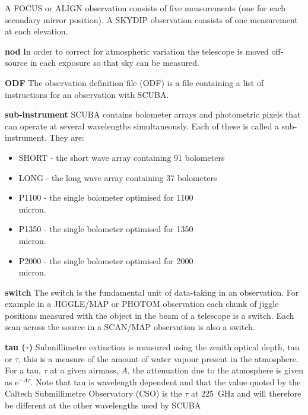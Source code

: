 \documentclass[twoside,11pt]{article}
\newcommand{\htmladdnormallink}[2]{#1}
\renewcommand{\_}{\texttt{\symbol{95}}}
\begin{document}
\begin{description}
A FOCUS or ALIGN observation consists of five measurements (one for each
secondary mirror position). A SKYDIP observation consists of one measurement
at each elevation.

\item{{\bf nod}} In order to correct for atmospheric variation the telescope
is moved off-source in each exposure so that sky can be measured.

\item{{\bf ODF}} The observation definition file (ODF) is a file containing a
list of instructions for an observation with SCUBA.

\item{{\bf sub-instrument}} SCUBA contains bolometer arrays and photometric
pixels that can operate at several wavelengths simultaneously. Each of these
is called a sub-instrument. They are:

\begin{itemize}
\item SHORT - the short wave array containing 91 bolometers
\item LONG - the long wave array containing 37 bolometers
\item P1100 - the single bolometer optimised for 1100\\micron.
\item P1350 - the single bolometer optimised for 1350\\micron.
\item P2000 - the single bolometer optimised for 2000\\micron.
\end{itemize}


\item{{\bf switch}} The switch is the fundamental unit of data-taking in an
observation. For example in a JIGGLE/MAP or PHOTOM observation each chunk of
jiggle positions measured with the object in the beam of a telescope is a
switch. Each scan across the source in a SCAN/MAP observation is also a switch.

\item{{\bf tau ($\tau$)}} Submillimetre extinction is measured using the
zenith optical depth, tau or $\tau$, this is a measure of the amount of water
vapour present in the atmosphere. For a tau, $\tau$ at a given airmass, $A$,
the attenuation due to the atmosphere is given as e$^{-A \tau}$. Note that tau
is wavelength dependent and that the value quoted by the
\htmladdnormallink{Caltech Submillimetre
Observatory}{http://www.cco.caltech.edu/\~{}cso/} (CSO) is the $\tau$ at 225~GHz and will therefore be different at
the other wavelengths used by SCUBA

\end{description}
\end{document}
